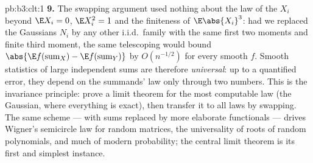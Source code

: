 \begin{solution}{pb:b3:clt:1}
\textbf{9.} The swapping argument used nothing about the law
of the $X_i$ beyond $\E X_i = 0$, $\E X_i^2 = 1$ and the
finiteness of $\E\abs{X_i}^3$: had we replaced the Gaussians
$N_i$ by any other i.i.d.\ family with the same first two
moments and finite third moment, the same telescoping would
bound $\abs{\E f(\text{sum}_X) - \E f(\text{sum}_Y)}$ by
$O(n^{-1/2})$ for every smooth $f$. Smooth statistics of
large independent sums are therefore \emph{universal}: up to
a quantified error, they depend on the summands' law only
through two numbers. This is the invariance principle:
prove a limit theorem for the most computable law (the
Gaussian, where everything is exact), then transfer it to
all laws by swapping. The same scheme --- with sums replaced
by more elaborate functionals --- drives Wigner's semicircle
law for random matrices, the universality of roots of random
polynomials, and much of modern probability; the central
limit theorem is its first and simplest instance.
\end{solution}

